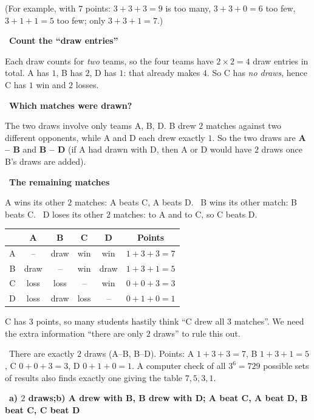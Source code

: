 \documentclass[11pt]{article}
\providecommand{\AnsWord}{Đáp số}
\newcommand{\ans}[1]{\par\smallskip{\bfseries\color{tmGreen!88!black}\AnsWord:}\ {\bfseries\color{AnsRed}#1}\par}
\newcommand{\step}[2]{\par\smallskip\noindent{\bfseries\color{tmBlue!85!black}\StepWord~#1.}\ {\bfseries #2}\par\nopagebreak}
\newcommand{\verify}[1]{\par\smallskip\noindent{\bfseries\color{tmGreen!80!black}\faCheckCircle\ \CheckWord}\ #1\par}
\def\AnsWord{Answer}
\def\StepWord{Step}
\def\CheckWord{Check:}
\begin{document}
{\begin{center}
\begin{tabular}{|c|c|l|}
\end{tabular}
\end{center}
(For example, with $7$ points: $3 + 3 + 3 = 9$ is too many, $3 + 3 + 0 = 6$ too few, $3 + 1 + 1 = 5$ too few; only $3 + 3 + 1 = 7$.)
\step{4}{Count the ``draw entries''}
Each draw counts for \emph{two} teams, so the four teams have $2\times 2 = 4$ draw entries in total. A has $1$, B has $2$, D has $1$:
that already makes $4$. So C has \emph{no draws}, hence C has $1$ win and $2$ losses.
\step{5}{Which matches were drawn?}
The two draws involve only teams A, B, D. B drew $2$ matches against two different opponents, while A and D each drew exactly $1$. So
the two draws are \textbf{A -- B} and \textbf{B -- D} (if A had drawn with D, then A or D would have $2$ draws once B's draws are added).
\step{6}{The remaining matches}
A wins its other $2$ matches: A beats C, A beats D. \ B wins its other match: B beats C. \ D loses its other $2$ matches: to A and to C,
so C beats D.
\begin{center}\small
\begin{tabular}{|c|c|c|c|c|c|}
\hline
\rowcolor{tmBlue!10} & A & B & C & D & Points\\ \hline
A & -- & draw & win & win & $1 + 3 + 3 = 7$\\ \hline
B & draw & -- & win & draw & $1 + 3 + 1 = 5$\\ \hline
C & loss & loss & -- & win & $0 + 0 + 3 = 3$\\ \hline
D & loss & draw & loss & -- & $0 + 1 + 0 = 1$\\ \hline
\end{tabular}
\end{center}
\begin{warnbox}C has $3$ points, so many students hastily think ``C drew all $3$ matches''. We need the extra information ``there are only
$2$ draws'' to rule this out.\end{warnbox}
\verify{There are exactly $2$ draws (A--B, B--D). Points: A $1 + 3 + 3 = 7$, B $1 + 3 + 1 = 5$, C $0 + 0 + 3 = 3$, D $0 + 1 + 0 = 1$. A
computer check of all $3^6 = 729$ possible sets of results also finds exactly one giving the table $7, 5, 3, 1$.}
\ans{a) $2$ draws;\quad b) A drew with B, B drew with D; A beat C, A beat D, B beat C, C beat D}
}

\end{document}
